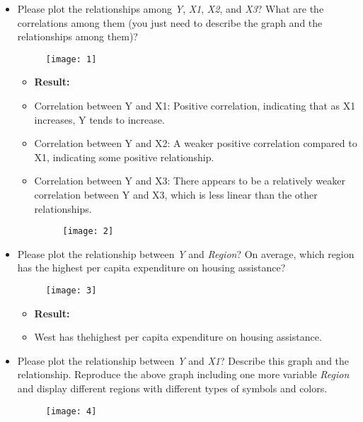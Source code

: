 \documentclass[12pt,letterpaper]{article}
\begin{document}
\begin{itemize}

\item
Please plot the relationships among \emph{Y}, \emph{X1}, \emph{X2}, and \emph{X3}? What are the correlations among them (you just need to describe the graph and the relationships among them)?
\vspace{.5cm}
 
\begin{figure}[H]
	\centering
	\texttt{[image: 1]}
\end{figure}

		\begin{itemize}
	\item \textbf{Result:}
	\item  Correlation between Y and X1: Positive correlation, indicating that as X1 increases, Y tends to increase.
	\item Correlation between Y and X2: A weaker positive correlation compared to X1, indicating some positive relationship.
	\item Correlation between Y and X3: There appears to be a relatively weaker correlation between Y and X3, which is less linear than the other relationships.\\
	\begin{figure}[H]
		\centering
		\texttt{[image: 2]}
	\end{figure}
\end{itemize}
\item
Please plot the relationship between \emph{Y} and \emph{Region}? On average, which region has the highest per capita expenditure on housing assistance?
\vspace{.5cm}
 
\begin{figure}[H]
	\centering
	\texttt{[image: 3]}
\end{figure}
\begin{itemize}
	\item \textbf{Result:}
	\item  West has thehighest per capita expenditure on housing assistance.\\

\end{itemize}
\item
Please plot the relationship between \emph{Y} and \emph{X1}? Describe this graph and the relationship. Reproduce the above graph including one more variable \emph{Region} and display different regions with different types of symbols and colors.
\vspace{.5cm}
 
\begin{figure}[H]
	\centering
	\texttt{[image: 4]}
\end{figure}


\end{itemize}
\end{document}
